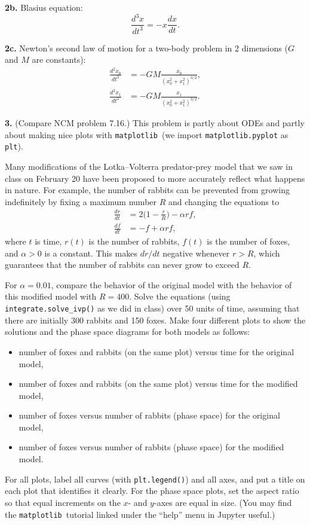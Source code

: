 \documentclass[11pt]{article}
\newcommand{\matplotlib}{{\tt matplotlib}}  %
\begin{document}
\par\bigskip
{\bf 2b.} Blasius equation:
$$ \frac{d^3 x}{dt^3} = -x\frac{dx}{dt}. $$

\par\bigskip
{\bf 2c.} Newton's second law of motion for a two-body problem in 2 dimensions 
($G$ and $M$ are constants):
\begin{align}
\frac{d^2 x_0}{dt^2} &= -GM\frac{x_0}{(x_0^2 + x_1^2)^{3/2}}, \\
\frac{d^2 x_1}{dt^2} &= -GM\frac{x_1}{(x_0^2 + x_1^2)^{3/2}}.
\end{align}

\par\bigskip
{\bf 3.} (Compare NCM problem 7.16.)
This problem is partly about ODEs and partly about making nice plots with
\matplotlib\ (we import {\tt matplotlib.pyplot} as {\tt plt}).

Many modifications of the Lotka--Volterra predator-prey model
that we saw in class on February 20 have been proposed to
more accurately reflect what happens in nature.
For example, the number of rabbits can be prevented from growing
indefinitely by fixing a maximum number $R$ and changing the equations to
\begin{align}
\frac{dr}{dt} &= 2\Big(1-\frac{r}{R}\Big) - \alpha rf, \\
\frac{df}{dt} &= -f + \alpha rf,
\end{align}
where $t$ is time, $r(t)$ is the number of rabbits, 
$f(t)$ is the number of foxes, and $\alpha>0$ is a constant.
This makes $dr/dt$ negative whenever $r > R$, 
which guarantees that the number of rabbits can never grow to exceed $R$.

For $\alpha = 0.01$, compare the behavior of the original model
with the behavior of this modified model with $R = 400$.
Solve the equations (using {\tt integrate.solve\_ivp()} as we did in class)
over 50 units of time, 
assuming that there are initially 300 rabbits and 150 foxes.
Make four different plots to show the solutions and the phase
space diagrams for both models as follows:
\begin{itemize}
\item number of foxes and rabbits (on the same plot) versus time for the original model,
\item number of foxes and rabbits (on the same plot) versus time for the modified model,
\item number of foxes versus number of rabbits (phase space) for the original model,
\item number of foxes versus number of rabbits (phase space) for the modified model.
\end{itemize}
For all plots, label all curves (with {\tt plt.legend()}) and all axes,
and put a title on each plot that identifies it clearly.
For the phase space plots, set the aspect
ratio so that equal increments on the $x$- and $y$-axes are equal in size.
(You may find the \matplotlib\ tutorial linked under the ``help'' menu
in Jupyter useful.)
\end{document}
